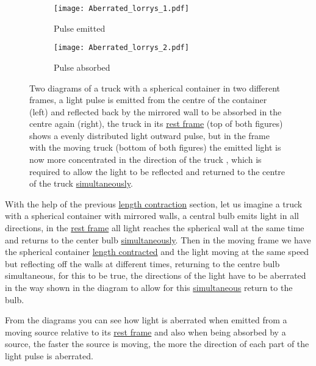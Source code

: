 \begin{figure}[htbp]
\begin{subfigure}{.49\textwidth}
\centering
       \texttt{[image: Aberrated\_lorrys\_1.pdf]}
    \caption{Pulse emitted}
    \label{fig: truck aberrated 1}
\end{subfigure}
\begin{subfigure}{.49\textwidth}
\centering
       \texttt{[image: Aberrated\_lorrys\_2.pdf]}
    \caption{Pulse absorbed}
    \label{fig: truck aberrated 2}
\end{subfigure}
\caption{Two diagrams of a truck with a spherical container in two different frames, a light pulse is emitted from the centre of the container (left) and reflected back by the mirrored wall to be absorbed in the centre again (right), the truck in its \protect\hyperlink{def-proper-frame}{rest frame} (top of both figures) shows a evenly distributed light outward pulse, but in the frame with the moving truck (bottom of both figures) the emitted light is now more concentrated in the direction of the truck , which is required to allow the light to be reflected and returned to the centre of the truck \protect\hyperlink{def-simultaneity}{simultaneously}.}
\label{fig: truck aberrated}
\end{figure}

\iffalse javascript{Aberration} \fi


With the help of the previous \hyperlink{def-length-contraction}{length contraction} section, let us imagine a truck with a spherical container with mirrored walls, a central bulb emits light in all directions, in the \hyperlink{def-proper-frame}{rest frame} all light reaches the spherical wall at the same time and returns to the center bulb \hyperlink{def-simultaneity}{simultaneously}.
Then in the moving frame we have the spherical container \hyperlink{def-length-contraction}{length contracted} and the light moving at the same speed but reflecting off the walls at different times, returning to the centre bulb simultaneous, for this to be true, the directions of the light have to be aberrated in the way shown in the diagram to allow for this \hyperlink{def-simultaneity}{simultaneous} return to the bulb.

From the diagrams you can see how light is aberrated when emitted from a moving source relative to its \hyperlink{def-proper-frame}{rest frame} and also when being absorbed by a source, the faster the source is moving, the more the direction of each part of the light pulse is aberrated.


